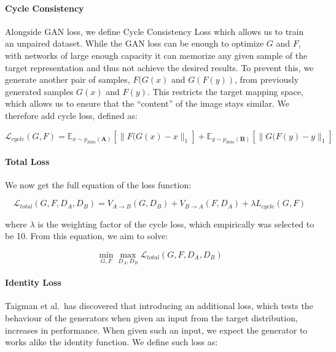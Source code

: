 \documentclass[]{article}
\begin{document}
\paragraph{Cycle Consistency}

Alongside GAN loss, we define Cycle Consistency Loss which allows us to
train an unpaired dataset. While the GAN loss can be enough to optimize
\(G\) and \(F\), with networks of large enough capacity it can memorize
any given sample of the target representation and thus not achieve the
desired results. To prevent this, we generate another pair of samples,
\(F(G(x)\) and \(G(F(y))\), from previously generated samples \(G(x)\)
and \(F(y)\). This restricts the target mapping space, which allows us
to ensure that the ``content'' of the image stays similar. We therefore
add cycle loss, defined as:

\begin{equation}
    \mathcal{L}_{cycle}(G, F) = \mathbb{E}_{x \sim p_{data}(\mathbf{A})}[\|F(G(x) - x\|_1] + \mathbb{E}_{y \sim p_{data}(\mathbf{B})}[\|G(F(y) - y\|_1]
\end{equation}

\paragraph{Total Loss}

We now get the full equation of the loss function:

\begin{equation}
    \mathcal{L}_{total}(G, F, D_A, D_B) = V_{A \rightarrow B}(G, D_B) + V_{B \rightarrow A}(F, D_A) + \lambda L_{cycle}(G, F) \label{eq:cyclegan_total}
\end{equation}

where \(\lambda\) is the weighting factor of the cycle loss, which
empirically was selected to be 10. From this equation, we aim to solve:

\begin{equation}
    \min_{G, F} \max_{D_A, D_B} \mathcal{L}_{total}(G, F, D_A, D_B)
\end{equation}

\paragraph{Identity Loss}

Taigman et al.~has discovered that introducing an additional loss, which
tests the behaviour of the generators when given an input from the
target distribution, increases in performance. When given such an input,
we expect the generator to works alike the identity function. We define
such loss as:
\end{document}
